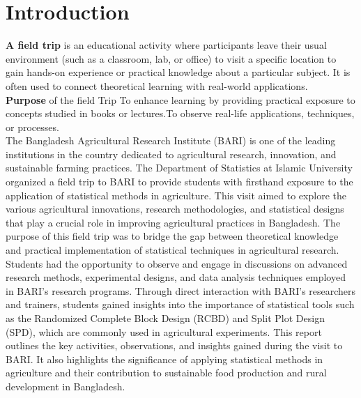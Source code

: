\documentclass[oneside,12pt,fleqn]{book}
\begin{document}
\chapter{Introduction}
\textbf {A field trip} is an educational activity where participants leave their usual environment (such as a classroom, lab, or office) to visit a specific location to gain hands-on experience or practical knowledge about a particular subject. It is often used to connect theoretical learning with real-world applications.\\
\textbf{Purpose} of the field Trip To enhance learning by providing practical exposure to concepts studied in books or lectures.To observe real-life applications, techniques, or processes.\\
The Bangladesh Agricultural Research Institute (BARI) is one of the leading institutions in the country dedicated to agricultural research, innovation, and sustainable farming practices. The Department of Statistics at Islamic University organized a field trip to BARI to provide students with firsthand exposure to the application of statistical methods in agriculture. This visit aimed to explore the various agricultural innovations, research methodologies, and statistical designs that play a crucial role in improving agricultural practices in Bangladesh.
The purpose of this field trip was to bridge the gap between theoretical knowledge and practical implementation of statistical techniques in agricultural research. Students had the opportunity to observe and engage in discussions on advanced research methods, experimental designs, and data analysis techniques employed in BARI’s research programs. Through direct interaction with BARI’s researchers and trainers, students gained insights into the importance of statistical tools such as the Randomized Complete Block Design (RCBD) and Split Plot Design (SPD), which are commonly used in agricultural experiments.
This report outlines the key activities, observations, and insights gained during the visit to BARI. It also highlights the significance of applying statistical methods in agriculture and their contribution to sustainable food production and rural development in Bangladesh.
\end{document}
